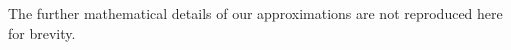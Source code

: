 \documentclass{article}
\newcommand{\given}{\ensuremath{\mid}}
\newcommand{\cm}[1]{\ensuremath{\mathcal{#1}}}
\newcommand{\bm}[1]{\ensuremath{\mathbf{#1}}}
\newcommand{\data}{\ensuremath{\cm{D}}}
\newcommand{\vect}[1]{\bm{#1}}
\newcommand{\vs}{\vect{\sigma}}
\newcommand{\amean}[2]{\tilde{{m}}(#1 \given #2 )}
\newcommand{\acov}[2]{\tilde{{C}}(#1 \given #2 )}
\newcommand{\p}[2]{p(#1\given#2)}
\newcommand{\fPr}{p}
\newcommand{\Prob}[2]{\fPr(#1 \given #2 )}
\newcommand{\st}{_{\star}}
\newcommand{\tr}{\ensuremath{\mathsf{T}}}
\DeclareMathOperator{\chol}{chol}
\begin{document}
 The further mathematical details of our approximations are not
reproduced here for brevity.
\end{document}
